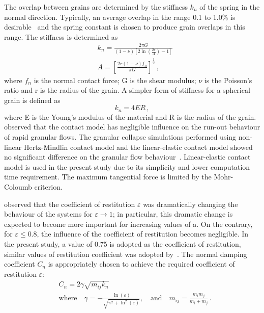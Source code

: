 The overlap between grains are determined by the stiffness 
$\textit{k}_{\textit{n}}$ of the spring in the normal direction. Typically, 
an average overlap in the range 0.1 to 1.0\% is desirable~\cite{Zenit2005} and 
the spring constant is chosen to produce grain overlaps in this range. The 
stiffness is determined as
\begin{align}
& \textit{k}_{\textit{n}}=\frac{2 \pi G}{(1-\nu)[2\ln(\frac{2r}{A})-1]} \\ 
& A = [\frac{2r(1-\nu)f_{n}}{\pi G}]^{\frac{1	}{2}}\,,
\end{align}
where $f_{n}$ is the normal contact force; G is the shear modulus; $\nu$ is the 
Poisson's ratio and r is the radius of the grain. A simpler form of stiffness 
for a spherical grain is defined as
\begin{equation}
\textit{k}_{\textit{n}}=4ER\,,
\end{equation}
where E is the Young's modulus of the material and R is the radius of the 
grain.~\citet{Cambou2009} observed that the contact model has negligible 
influence on the run-out behaviour of rapid granular flows. The granular 
collapse simulations performed using non-linear Hertz-Mindlin contact model and 
the linear-elastic contact model showed no significant difference on the 
granular flow behaviour~\citet{Utili2014}. Linear-elastic contact model is used 
in the present study due to its simplicity and lower computation time 
requirement. The maximum tangential force is limited by the Mohr-Coloumb 
criterion. 


\citet{Staron2006a} observed that the coefficient of restitution $\varepsilon$ 
was dramatically changing the behaviour of the systems for 
$\varepsilon\longrightarrow 1$; in particular, this dramatic change is expected 
to become more important for increasing values of a. On the contrary, for 
$\varepsilon \le 0.8$, the influence of the coefficient of restitution becomes 
negligible. In the present study, a value of 0.75 is adopted as the coefficient 
of restitution, similar values of restitution coefficient was adopted 
by~\citet{Zenit2005,Girolami}. The normal damping coefficient 
$C_{\textit{n}}$ 
is appropriately chosen to achieve the required coefficient of restitution 
$\varepsilon$:
\begin{align}
& C_{\textit{n}}=2\gamma \sqrt{m_{\textit{ij}}k_{\textit{n}}} \\ 
& \mbox{where} \quad \gamma = -\frac{\ln(\varepsilon)}{\sqrt{\pi^{2}+\ln^2 
(\varepsilon)}},\quad \mbox{and} \quad 
\textit{m}_{\textit{ij}}=\frac{\textit{m}_{\textit{i}}\textit{m}_{\textit{j}}}{\textit{m}_{\textit{i}}
 + \textit{m}_{\textit{j}}} \,.
\end{align}

